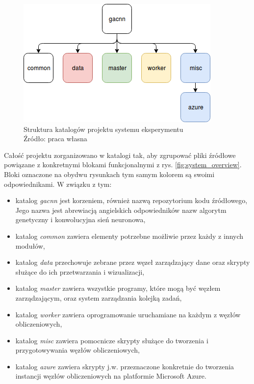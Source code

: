 \begin{figure}[h!tb]
	 \centering
	 \includegraphics[width = 0.7\linewidth]{img/folder_structure}
	 \caption{Struktura katalogów projektu systemu eksperymentu\\
              Źródło: praca własna}
	 \label{fig:folder_structure}
\end{figure}

Całość projektu zorganizowano w katalogi tak, aby zgrupować pliki źródłowe powiązane z konkretnymi blokami funkcjonalnymi z rys. \ref{fig:system_overview}.
Bloki oznaczone na obydwu rysunkach tym samym kolorem są swoimi odpowiednikami.
W związku z tym:
\begin{itemize}
  \item katalog \textit{gacnn} jest korzeniem, również nazwą repozytorium kodu źródłowego,
        Jego nazwa jest abrewiacją angielskich odpowiedników nazw algorytm genetyczny i konwolucyjna sień neuronowa,
  \item katalog \textit{common} zawiera elementy potrzebne możliwie przez każdy z innych modułów,
  \item katalog \textit{data} przechowuje zebrane przez węzeł zarządzający dane oraz skrypty służące do ich przetwarzania i wizualizacji,
  \item katalog \textit{master} zawiera wszystkie programy, które mogą być węzłem zarządzającym, oraz system zarządzania kolejką zadań,
  \item katalog \textit{worker} zawiera oprogramowanie uruchamiane na każdym z węzłów obliczeniowych,
  \item katalog \textit{misc} zawiera pomocnicze skrypty służące do tworzenia i przygotowywania węzłów obliczeniowych,
  \item katalog \textit{azure} zawiera skrypty j.w. przeznaczone konkretnie do tworzenia instancji węzłów obliczeniowych na platformie Microsoft Azure.
\end{itemize}

